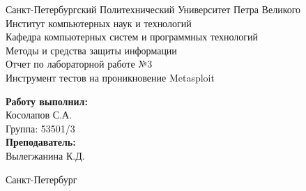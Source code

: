 \documentclass[a4paper]{article}
\begin{document}

\begin{titlepage}	%

	\begin{center}		%

		\large Санкт-Петербургский Политехнический Университет Петра Великого\\
		\large Институт компьютерных наук и технологий \\
		\large Кафедра компьютерных систем и программных технологий\\[6cm]
		
		\huge Методы и средства защиты информации\\[0.5cm] %
		\large Отчет по лабораторной работе №3\\[0.1cm]
		\large Инструмент тестов на проникновение Metasploit\\[5cm]

	\end{center}


	\begin{flushright} %
		\begin{minipage}{0.25\textwidth} %
			\begin{flushleft} %

				\large\textbf{Работу выполнил:}\\
				\large Косолапов С.А.\\
				\large {Группа:} 53501/3\\
				
				\large \textbf{Преподаватель:}\\
				\large Вылегжанина К.Д.

			\end{flushleft}
		\end{minipage}
	\end{flushright}
	
	\vfill %

	\begin{center}
	\large Санкт-Петербург\\
	\large \the\year %
	\end{center} %

\thispagestyle{empty} %
\end{titlepage} %
\end{document}
